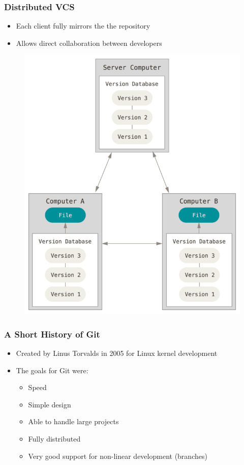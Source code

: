 \documentclass{beamer}
\begin{document}
\begin{frame}
	\frametitle{Distributed VCS}
	\begin{itemize}
		\item{Each client fully mirrors the the repository}
		\item{Allows direct collaboration between developers}
	\end{itemize}
	\begin{figure}
		\includegraphics[scale=0.25]{Distributed_VCS-0.png}
	\end{figure}

\end{frame}


\begin{frame}
	\frametitle{A Short History of Git}
	\begin{itemize}
		\item{Created by Linus Torvalds in 2005 for Linux kernel development}
		\item{The goals for Git were:}
		\begin{itemize}
			\item{Speed}
			\item{Simple design}
			\item{Able to handle large projects}
			\item{Fully distributed}
			\item{Very good support for non-linear development (branches)}
		\end{itemize}
	\end{itemize}
\end{frame}
\end{document}
